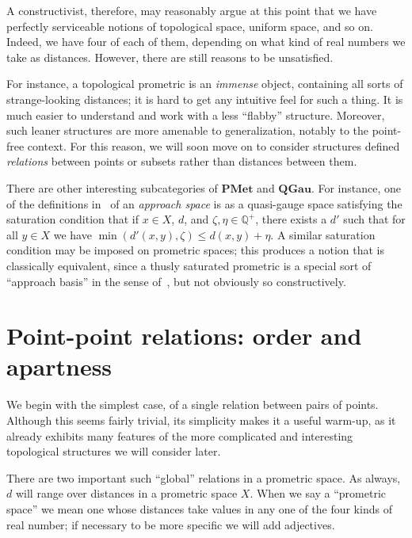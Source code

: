 \documentclass{article}
\def\Qp{\mathbb{Q}^+}
\def\PMet{\mathbf{PMet}}
\def\QGau{\mathbf{QGau}}
\begin{document}
A constructivist, therefore, may reasonably argue at this point that we have perfectly serviceable notions of topological space, uniform space, and so on.
Indeed, we have four of each of them, depending on what kind of real numbers we take as distances.
However, there are still reasons to be unsatisfied.

For instance, a topological prometric is an \emph{immense} object, containing all sorts of strange-looking distances; it is hard to get any intuitive feel for such a thing.
It is much easier to understand and work with a less ``flabby'' structure.
Moreover, such leaner structures are more amenable to generalization, notably to the point-free context.
For this reason, we will soon move on to consider structures defined \emph{relations} between points or subsets rather than distances between them.

\begin{rmk}
  There are other interesting subcategories of $\PMet$ and $\QGau$.
  For instance, one of the definitions in~\cite{approach} of an \emph{approach space} is as a quasi-gauge space satisfying the saturation condition that if $x\in X$, $d$, and $\zeta,\eta\in \Qp$, there exists a $d'$ such that for all $y\in X$ we have $\min(d'(x,y),\zeta) \le d(x,y) +\eta$.
  A similar saturation condition may be imposed on prometric spaces; this produces a notion that is classically equivalent, since a thusly saturated prometric is a special sort of ``approach basis'' in the sense of~\cite{approach}, but not obviously so constructively.
\end{rmk}


\section{Point-point relations: order and apartness}
\label{sec:point-point}
\label{sec:order}

We begin with the simplest case, of a single relation between pairs of points.
Although this seems fairly trivial, its simplicity makes it a useful warm-up, as it already exhibits many features of the more complicated and interesting topological structures we will consider later.

There are two important such ``global'' relations in a prometric space.
As always, $d$ will range over distances in a prometric space $X$.
When we say a ``prometric space'' we mean one whose distances take values in any one of the four kinds of real number; if necessary to be more specific we will add adjectives.
\end{document}
